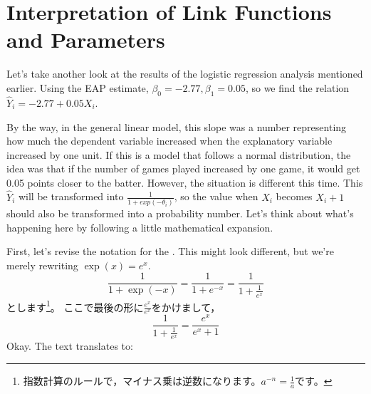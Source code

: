 \documentclass{ltjsbook}
\begin{document}




\section{Interpretation of Link Functions and Parameters}
Let's take another look at the results of the logistic regression analysis mentioned earlier. Using the EAP estimate, $\beta_0 = -2.77,\beta_1=0.05$, so we find the relation $\hat{Y}_i = -2.77 + 0.05X_i$.

By the way, in the general linear model, this slope was a number representing how much the dependent variable increased when the explanatory variable increased by one unit. If this is a model that follows a normal distribution, the idea was that if the number of games played increased by one game, it would get 0.05 points closer to the batter. However, the situation is different this time. This $\hat{Y}_i$ will be transformed into $\frac{1}{1+exp(-\theta_i)}$, so the value when $X_i$ becomes $X_i+1$ should also be transformed into a probability number.
Let's think about what's happening here by following a little mathematical expansion.

First, let's revise the notation for the . This might look different, but we're merely rewriting $\exp(x) = e^x$.
\[ \frac{1}{1+\exp(-x)} = \frac{1}{1+e^{-x}} = \frac{1}{1+\frac{1}{e^x}} \]
とします\footnote{指数計算のルールで，マイナス乗は逆数になります。$a^{-n}=\frac{1}{a}$です。}。
ここで最後の形に$\frac{e^x}{e^x}$をかけまして，
\[ \frac{1}{1+\frac{1}{e^x}}=\frac{e^x}{e^x+1} \]
Okay. The text translates to:
\end{document}
